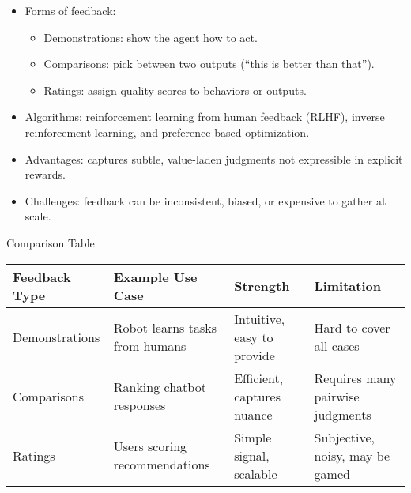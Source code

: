 \documentclass[
  letterpaper,
  DIV=11,
  numbers=noendperiod]{scrreprt}
\providecommand{\tightlist}{%
  \setlength{\itemsep}{0pt}\setlength{\parskip}{0pt}}
\begin{document}
\begin{itemize}
\item
  Forms of feedback:

  \begin{itemize}
  \tightlist
  \item
    Demonstrations: show the agent how to act.
  \item
    Comparisons: pick between two outputs (``this is better than
    that'').
  \item
    Ratings: assign quality scores to behaviors or outputs.
  \end{itemize}
\item
  Algorithms: reinforcement learning from human feedback (RLHF), inverse
  reinforcement learning, and preference-based optimization.
\item
  Advantages: captures subtle, value-laden judgments not expressible in
  explicit rewards.
\item
  Challenges: feedback can be inconsistent, biased, or expensive to
  gather at scale.
\end{itemize}

Comparison Table

\begin{longtable}[]{@{}
  >{\raggedright\arraybackslash}p{}
  >{\raggedright\arraybackslash}p{}
  >{\raggedright\arraybackslash}p{}
  >{\raggedright\arraybackslash}p{}@{}}
\toprule\noalign{}
\begin{minipage}[b]{\linewidth}\raggedright
Feedback Type
\end{minipage} & \begin{minipage}[b]{\linewidth}\raggedright
Example Use Case
\end{minipage} & \begin{minipage}[b]{\linewidth}\raggedright
Strength
\end{minipage} & \begin{minipage}[b]{\linewidth}\raggedright
Limitation
\end{minipage} \\
\midrule\noalign{}
\endhead
\bottomrule\noalign{}
\endlastfoot
Demonstrations & Robot learns tasks from humans & Intuitive, easy to
provide & Hard to cover all cases \\
Comparisons & Ranking chatbot responses & Efficient, captures nuance &
Requires many pairwise judgments \\
Ratings & Users scoring recommendations & Simple signal, scalable &
Subjective, noisy, may be gamed \\
\end{longtable}
\end{document}
